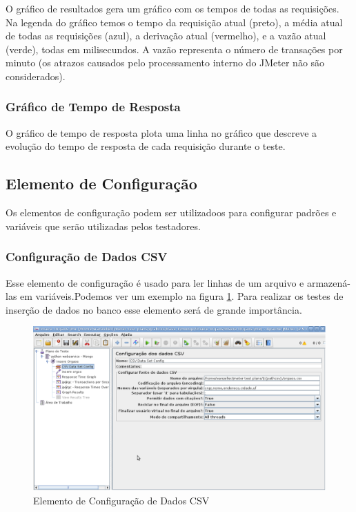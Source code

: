 O gráfico de resultados gera um gráfico com os tempos de todas as requisições. Na legenda do gráfico temos o tempo da requisição atual (preto), a média atual de todas as requisições (azul), a derivação atual (vermelho), e a vazão atual (verde), todas em milisecundos. A vazão representa o número de transações por minuto (os atrazos causados pelo processamento interno do JMeter não são considerados).

\subsubsection{Gráfico de Tempo de Resposta}

O gráfico de tempo de resposta plota uma linha no gráfico que descreve a evolução do tempo de resposta de cada requisição durante o teste.

\subsection{Elemento de Configuração}

Os elementos de configuração podem ser utilizadoos para configurar padrões e variáveis que serão utilizadas pelos testadores.

\subsubsection{Configuração de Dados CSV}

Esse elemento de configuração é usado para ler linhas de um arquivo e armazená-las em variáveis.Podemos ver um exemplo na figura \ref{fig:configuracao_csv}. Para realizar os testes de inserção de dados no banco esse elemento será de grande importância.

	\begin{figure}[!htbp]
		\begin{center}
			\includegraphics[width=1\textwidth]{configuracao_csv}
		\end{center}
		\caption{Elemento de Configuração de Dados CSV}
		\label{fig:configuracao_csv}
	\end{figure}















